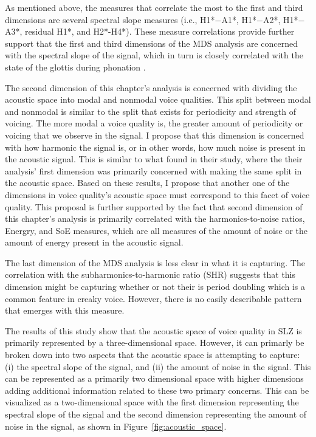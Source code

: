 As mentioned above, the measures that correlate the most to the first and third dimensions are several spectral slope measures (i.e., H1*$-$A1*, H1*$-$A2*, H1*$-$A3*, residual H1*, and H2*-H4*). These measure correlations provide further support that the first and third dimensions of the MDS analysis are concerned with the spectral slope of the signal, which in turn is closely correlated with the state of the glottis during phonation \citep{holmbergComparisonsAerodynamicElectroglottographic1995,kreimanMeasuresGlottalSource2007,garellekModelingVoiceSource2016,garellekPhoneticsVoice2019,chaiH1H2AcousticMeasure2022}.

The second dimension of this chapter's analysis is concerned with dividing the acoustic space into modal and nonmodal voice qualities. This split between modal and nonmodal is similar to the split that exists for periodicity and strength of voicing. The more modal a voice quality is, the greater amount of periodicity or voicing that we observe in the signal. I propose that this dimension is concerned with how harmonic the signal is, or in other words, how much noise is present in the acoustic signal. This is similar to what \citet{keatingCrosslanguageAcousticSpace2023} found in their study, where the their analysis' first dimension was primarily concerned with making the same split in the acoustic space. Based on these results, I propose that another one of the dimensions in voice quality's acoustic space must correspond to this facet of voice quality. This proposal is further supported by the fact that second dimension of this chapter's analysis is primarily correlated with the harmonics-to-noise ratios, Energry, and SoE measures, which are all measures of the amount of noise or the amount of energy present in the acoustic signal. 

The last dimension of the MDS analysis is less clear in what it is capturing. The correlation with the subharmonics-to-harmonic ratio (SHR) suggests that this dimension might be capturing whether or not their is period doubling which is a common feature in creaky voice. However, there is no easily describable pattern that emerges with this measure. 

The results of this study show that the acoustic space of voice quality in SLZ is primarily represented by a three-dimensional space. However, it can primarly be broken down into two aspects that the acoustic space is attempting to capture: (i) the spectral slope of the signal, and (ii) the amount of noise in the signal. This can be represented as a primarily two dimensional space with higher dimensions adding additional information related to these two primary concerns. This can be visualized as a two-dimensional space with the first dimension representing the spectral slope of the signal and the second dimension representing the amount of noise in the signal, as shown in Figure~\ref{fig:acoustic_space}.



